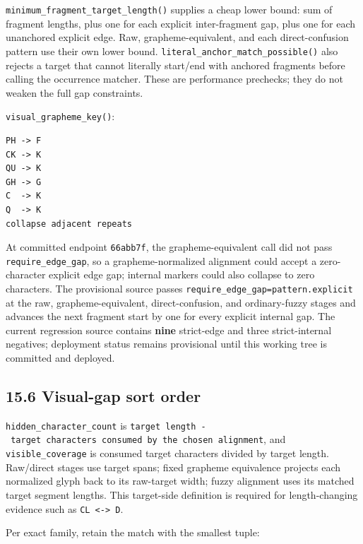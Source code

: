 \texttt{minimum\_\allowbreak{}fragment\_\allowbreak{}target\_\allowbreak{}length()} supplies a cheap lower bound: sum of fragment lengths, plus one for each explicit inter-fragment gap, plus one for each unanchored explicit edge. Raw, grapheme-equivalent, and each direct-confusion pattern use their own lower bound. \texttt{literal\_\allowbreak{}anchor\_\allowbreak{}match\_\allowbreak{}possible()} also rejects a target that cannot literally start/end with anchored fragments before calling the occurrence matcher. These are performance prechecks; they do not weaken the full gap constraints.

\texttt{visual\_\allowbreak{}grapheme\_\allowbreak{}key()}:

\begin{verbatim}
PH -> F
CK -> K
QU -> K
GH -> G
C  -> K
Q  -> K
collapse adjacent repeats
\end{verbatim}

At committed endpoint \texttt{66abb7f}, the grapheme-equivalent call did not pass \texttt{require\_\allowbreak{}edge\_\allowbreak{}gap}, so a grapheme-normalized alignment could accept a zero-character explicit edge gap; internal markers could also collapse to zero characters. The provisional source passes \texttt{require\_\allowbreak{}edge\_\allowbreak{}gap=pattern.explicit} at the raw, grapheme-equivalent, direct-confusion, and ordinary-fuzzy stages and advances the next fragment start by one for every explicit internal gap. The current regression source contains \textbf{nine} strict-edge and three strict-internal negatives; deployment status remains provisional until this working tree is committed and deployed.

\subsection{15.6 Visual-gap sort order}\label{156-visual-gap-sort-order}

\texttt{hidden\_\allowbreak{}character\_\allowbreak{}count} is \texttt{target\ length\ -\ target\ characters\ consumed\ by\ the\ chosen\ alignment}, and \texttt{visible\_\allowbreak{}coverage} is consumed target characters divided
by target length. Raw/direct stages use target spans; fixed grapheme equivalence
projects each normalized glyph back to its raw-target width; fuzzy alignment
uses its matched target segment lengths. This target-side definition is required
for length-changing evidence such as \texttt{CL\ \textless{}-\textgreater{}\ D}.

Per exact family, retain the match with the smallest tuple:

